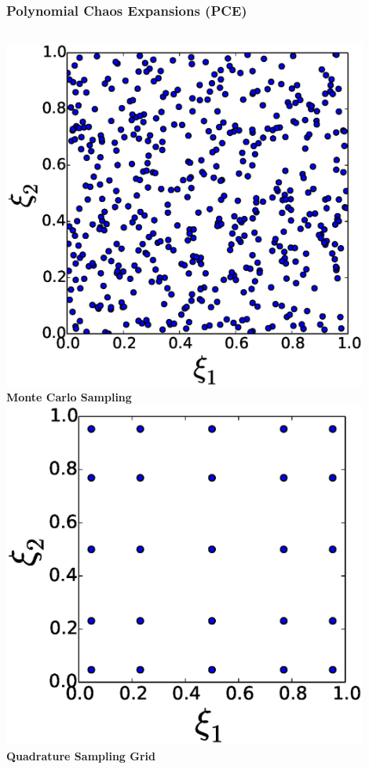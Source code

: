 \documentclass[9pt]{beamer}
\begin{document}
\begin{frame}
\frametitle{Polynomial Chaos Expansions (PCE)}
\label{sec-2-4}

\begin{columns}[c]
    \centering
    \includegraphics[width=0.9\textwidth]{MonteCarlo} \\
    \bf{Monte Carlo Sampling}
    \centering
    \includegraphics[width=0.9\textwidth]{QuadraturePoints} \\
    {\bf Quadrature Sampling Grid}
\end{columns}
\end{frame}
\end{document}

